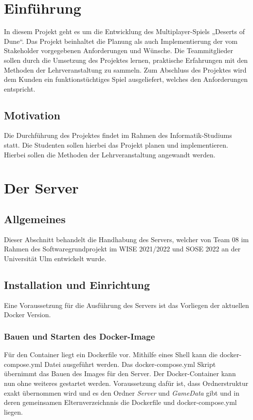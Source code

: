 \documentclass[12pt]{article}
\begin{document}
\tableofcontents
\thispagestyle{empty}

\newpage

\pagestyle{fancy}

\fancyhead[R]{\thepage}
\fancyhead[L]{\leftmark}
\fancyfoot{}


\section{Einführung}

In diesem Projekt geht es um die Entwicklung des Multiplayer-Spiels „Deserts of Dune“.
Das Projekt beinhaltet die Planung als auch Implementierung der vom Stakeholder vorgegebenen
Anforderungen und Wünsche. Die Teammitglieder sollen durch die Umsetzung des Projektes lernen, praktische Erfahrungen mit den Methoden der Lehrveranstaltung zu sammeln. Zum Abschluss des Projektes wird dem Kunden ein funktionstüchtiges Spiel ausgeliefert, welches den Anforderungen entspricht.


\subsection{Motivation}

Die Durchführung des Projektes findet im Rahmen des Informatik-Studiums statt. Die Studenten sollen hierbei das Projekt planen und implementieren. Hierbei sollen die Methoden der Lehrveranstaltung angewandt werden.

\newpage


\section{Der Server}
\label{sec:Server}

\subsection{Allgemeines}
Dieser Abschnitt behandelt die Handhabung des Servers, welcher von Team 08 im Rahmen des Softwaregrundprojekt im
WISE 2021/2022 und SOSE 2022 an der Universität Ulm entwickelt wurde.

\subsection{Installation und Einrichtung}
Eine Voraussetzung für die Ausführung des Servers ist das Vorliegen der aktuellen Docker Version.

\subsubsection{Bauen und Starten des Docker-Image}
Für den Container liegt ein Dockerfile vor. Mithilfe eines Shell kann die docker-compose.yml Datei ausgeführt werden. Das docker-compose.yml Skript übernimmt das Bauen des Images für den Server. Der Docker-Container kann nun ohne weiteres gestartet werden. 
Voraussetzung dafür ist, dass Ordnerstruktur exakt übernommen wird und es den Ordner \textit{Server} und \textit{GameData} gibt und in deren gemeinsamen Elternverzeichnnis die Dockerfile und docker-compose.yml liegen.
\end{document}
